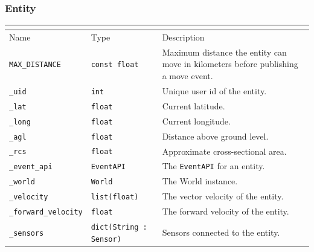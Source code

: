 \documentclass[titlepage]{article}
\newcommand{\attributes}[1]{
    \begin{center}
        \begin{tabular}{|p{3cm}|p{3cm}|p{8cm}|}
            \multicolumn{3}{|l|}{\cellcolor[gray]{0.5}{\textbf{Attributes}}} \\ \hline
            \rowcolor[gray]{0.8} Name & Type & Description \\ \hline 
            #1
        \end{tabular}
    \end{center}
}
\newcommand{\attribute}[3]{
    \texttt{#1} & \texttt{#2} & #3 \\ \hline
}
\begin{document}
\subsubsection{Entity}
\attributes{
    \attribute{MAX\_DISTANCE}{const float}{Maximum distance the entity can move in kilometers before publishing a move event.}
    \attribute{\_uid}{int}{Unique user id of the entity.}
    \attribute{\_lat}{float}{Current latitude.}
    \attribute{\_long}{float}{Current longitude.}
    \attribute{\_agl}{float}{Distance above ground level.}
    \attribute{\_rcs}{float}{Approximate cross-sectional area.}
    \attribute{\_event\_api}{EventAPI}{The \texttt{EventAPI} for an entity.}
    \attribute{\_world}{World}{The World instance.}
    \attribute{\_velocity}{\texttt{list(float)}}{The vector velocity of the entity.}
    \attribute{\_forward\_velocity}{float}{The forward velocity of the entity.}
    \attribute{\_sensors}{dict(String : Sensor)}{Sensors connected to the entity.}
}
\end{document}
